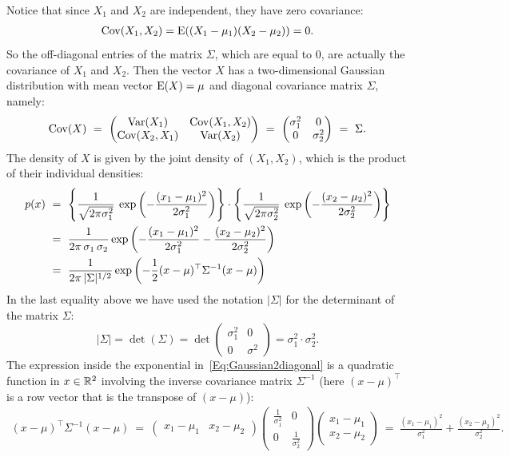 \documentclass[11pt]{article}
\def\Ex#1{{\rm E}(#1)}
\def\Var#1{{\rm Var}(#1)}
\begin{document}
Notice that since $X_1$ and $X_2$ are independent, they have zero covariance:
\begin{align*}
{\rm Cov}(X_1, X_2) = \Ex{(X_1 - \mu_1)(X_2 - \mu_2)} = 0.
\end{align*}
So the off-diagonal entries of the matrix $\Sigma$, which are equal to $0$, are actually the covariance of $X_1$ and $X_2$. Then the vector $X$ has a two-dimensional Gaussian distribution with mean vector $\Ex{X} = \mu$ and diagonal covariance matrix $\Sigma$, namely:
\begin{align*}
{\rm Cov}(X) ~=~ \begin{pmatrix} \Var{X_1} & {\rm Cov}(X_1, X_2) \\ {\rm Cov}(X_2, X_1) & \Var{X_2} \end{pmatrix}
~=~ \begin{pmatrix} \sigma_1^2 & 0 \\ 0 & \sigma_2^2 \end{pmatrix} 
~=~ \Sigma.
\end{align*}
The density of $X$ is given by the joint density of $(X_1,X_2)$, which is the product of their individual densities:
\begin{align}
p(x) ~&=~ \left\{\frac{1}{\sqrt{2\pi \sigma_1^2}} \: \exp\left(-\frac{(x_1-\mu_1)^2}{2\sigma_1^2} \right) \right\} \cdot \left\{\frac{1}{\sqrt{2\pi \sigma_2^2}} \: \exp\left(-\frac{(x_2-\mu_2)^2}{2\sigma_2^2} \right) \right\}  \notag \\
~&=~ \frac{1}{2\pi \, \sigma_1 \, \sigma_2} \exp \left(- \frac{(x_1 - \mu_1)^2}{2 \sigma_1^2} - \frac{(x_2 - \mu_2)^2}{2\sigma_2^2} \right)   \notag \\
~&=~ \frac{1}{2\pi \, |\Sigma|^{1/2}} \exp \left(- \frac{1}{2} (x - \mu)^\top \Sigma^{-1} (x-\mu) \right)  \label{Eq:Gaussian2diagonal}
\end{align}
In the last equality above we have used the notation $|\Sigma|$ for the determinant of the matrix $\Sigma$:
$$|\Sigma| = \det(\Sigma) = \det \begin{pmatrix} \sigma_1^2 & 0 \\ 0 & \sigma^2 \end{pmatrix} = \sigma_1^2 \cdot \sigma_2^2.$$
The expression inside the exponential in~\eqref{Eq:Gaussian2diagonal} is a quadratic function in $x \in \mathbb{R}^2$ involving the inverse covariance matrix $\Sigma^{-1}$ (here $(x-\mu)^\top$ is a row vector that is the transpose of $(x-\mu)$):
\begin{align*}
(x - \mu)^\top \Sigma^{-1} (x-\mu)
~=~ \begin{pmatrix} x_1 - \mu_1 & x_2 - \mu_2 \end{pmatrix}
\begin{pmatrix} \frac{1}{\sigma_1^2} & 0 \\ 0 & \frac{1}{\sigma_2^2} \end{pmatrix}
\begin{pmatrix} x_1 - \mu_1 \\ x_2 - \mu_2 \end{pmatrix}
~=~ \frac{(x_1 - \mu_1)^2}{\sigma_1^2} + \frac{(x_2 - \mu_2)^2}{\sigma_2^2}.
\end{align*}
\end{document}
